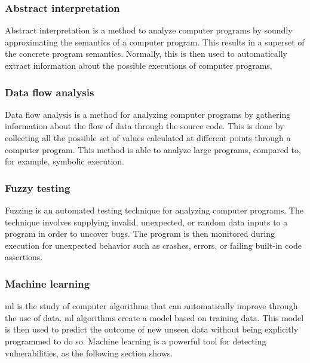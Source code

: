 \subsubsection{Abstract interpretation}
\label{sec:abstract-interpretation}
Abstract interpretation is a method to analyze computer programs by soundly approximating the semantics of a computer program. This results in a superset of the concrete program semantics. Normally, this is then used to automatically extract information about the possible executions of computer programs.

\subsubsection{Data flow analysis}
\label{sec:data-flow-analysis}
Data flow analysis is a method for analyzing computer programs by gathering information about the flow of data through the source code. This is done by collecting all the possible set of values calculated at different points through a computer program. This method is able to analyze large programs, compared to, for example, symbolic execution.

\subsubsection{Fuzzy testing}
\label{sec:fuzzy-testing}
Fuzzing is an automated testing technique for analyzing computer programs. The technique involves supplying invalid, unexpected, or random data inputs to a program in order to uncover bugs. The program is then monitored during execution for unexpected behavior such as crashes, errors, or failing built-in code assertions.

\subsubsection{Machine learning}
\label{sec:machine-learning}
\acrfull{ml} is the study of computer algorithms that can automatically improve through the use of data. \acrshort{ml} algorithms create a model based on training data. This model is then used to predict the outcome of new unseen data without being explicitly programmed to do so. Machine learning is a powerful tool for detecting vulnerabilities, as the following section shows.

